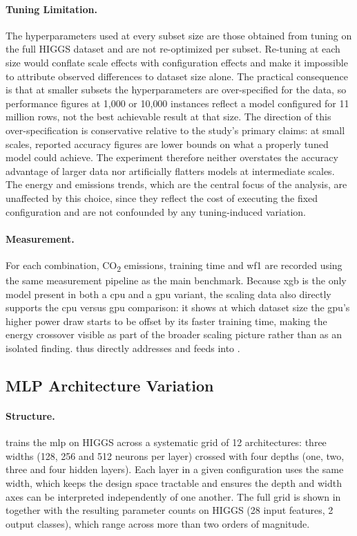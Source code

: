 \paragraph{Tuning Limitation.}
The hyperparameters used at every subset size are those obtained from tuning on the full HIGGS dataset and are not re-optimized per subset. Re-tuning at each size would conflate scale effects with configuration effects and make it impossible to attribute observed differences to dataset size alone. The practical consequence is that at smaller subsets the hyperparameters are over-specified for the data, so performance figures at 1{,}000 or 10{,}000 instances reflect a model configured for 11 million rows, not the best achievable result at that size. The direction of this over-specification is conservative relative to the study's primary claims: at small scales, reported accuracy figures are lower bounds on what a properly tuned model could achieve. The experiment therefore neither overstates the accuracy advantage of larger data nor artificially flatters models at intermediate scales. The energy and emissions trends, which are the central focus of the analysis, are unaffected by this choice, since they reflect the cost of executing the fixed configuration and are not confounded by any tuning-induced variation.

\paragraph{Measurement.}
For each combination, CO\textsubscript{2} emissions, training time and \gls{wf1} are recorded using the same measurement pipeline as the main benchmark. Because \gls{xgb} is the only model present in both a \gls{cpu} and a \gls{gpu} variant, the scaling data also directly supports the \gls{cpu} versus \gls{gpu} comparison: it shows at which dataset size the \gls{gpu}'s higher power draw starts to be offset by its faster training time, making the energy crossover visible as part of the broader scaling picture rather than as an isolated finding.  thus directly addresses  and feeds into .


\subsection{MLP Architecture Variation}
\label{design_mlp_variation}\label{exp:3}

\paragraph{Structure.}
 trains the \gls{mlp} on HIGGS across a systematic grid of 12 architectures: three widths (128, 256 and 512 neurons per layer) crossed with four depths (one, two, three and four hidden layers). Each layer in a given configuration uses the same width, which keeps the design space tractable and ensures the depth and width axes can be interpreted independently of one another. The full grid is shown in  together with the resulting parameter counts on HIGGS (28 input features, 2 output classes), which range across more than two orders of magnitude.

